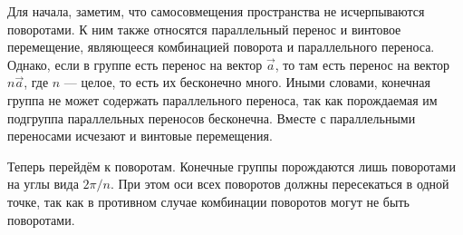 \documentclass{ncc}
\begin{document}
Для начала, заметим, что самосовмещения пространства не исчерпываются поворотами. К ним также относятся параллельный перенос и винтовое перемещение, являющееся комбинацией поворота и параллельного переноса. Однако, если в группе есть перенос на вектор \(\vec{a}\), то там есть перенос на вектор \( n\vec{a} \), где \(n\) --- целое, то есть их бесконечно много. Иными словами, конечная группа не может содержать параллельного переноса, так как порождаемая им подгруппа параллельных переносов бесконечна. Вместе с параллельными переносами исчезают и винтовые перемещения.

Теперь перейдём к поворотам. Конечные группы порождаются лишь поворотами на углы вида \( 2\pi / n \). При этом оси всех поворотов должны пересекаться в одной точке, так как в противном случае комбинации поворотов могут не быть поворотами.
\end{document}
